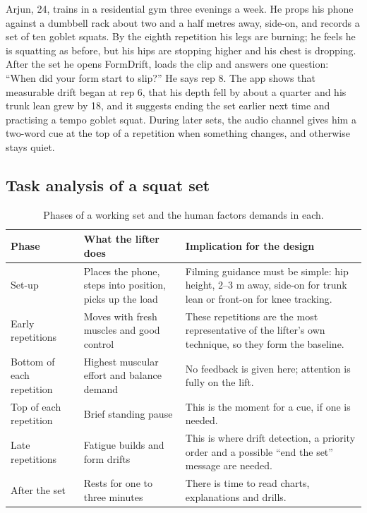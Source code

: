 \documentclass[12pt]{article}
\begin{document}
Arjun, 24, trains in a residential gym three evenings a week. He props his phone against a dumbbell rack about two and a half metres away, side-on, and records a set of ten goblet squats. By the eighth repetition his legs are burning; he feels he is squatting as before, but his hips are stopping higher and his chest is dropping. After the set he opens FormDrift, loads the clip and answers one question: ``When did your form start to slip?'' He says rep 8. The app shows that measurable drift began at rep 6, that his depth fell by about a quarter and his trunk lean grew by 18\degree, and it suggests ending the set earlier next time and practising a tempo goblet squat. During later sets, the audio channel gives him a two-word cue at the top of a repetition when something changes, and otherwise stays quiet.

\subsection{Task analysis of a squat set}

\begin{table}[!htbp]
\centering
\caption{Phases of a working set and the human factors demands in each.}
\begin{tabularx}{\textwidth}{>{\raggedright\arraybackslash}p{3.0cm} L L}
\toprule
\textbf{Phase} & \textbf{What the lifter does} & \textbf{Implication for the design} \\
\midrule
Set-up & Places the phone, steps into position, picks up the load & Filming guidance must be simple: hip height, 2--3 m away, side-on for trunk lean or front-on for knee tracking. \\
Early repetitions & Moves with fresh muscles and good control & These repetitions are the most representative of the lifter's own technique, so they form the baseline. \\
Bottom of each repetition & Highest muscular effort and balance demand & No feedback is given here; attention is fully on the lift. \\
Top of each repetition & Brief standing pause & This is the moment for a cue, if one is needed. \\
Late repetitions & Fatigue builds and form drifts & This is where drift detection, a priority order and a possible ``end the set'' message are needed. \\
After the set & Rests for one to three minutes & There is time to read charts, explanations and drills. \\
\bottomrule
\end{tabularx}
\end{table}
\end{document}
